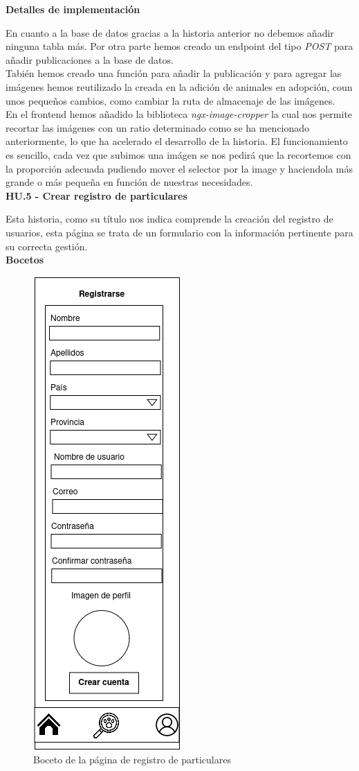\textbf{Detalles de implementación}

En cuanto a la base de datos gracias a la historia anterior no debemos añadir ninguna tabla más. Por otra parte hemos creado un endpoint del tipo \textit{POST} para añadir publicaciones a la base de datos. \\

Tabién hemos creado una función para añadir la publicación y para agregar las imágenes hemos reutilizado la creada en la adición de animales en adopción, coun unos pequeños cambios, como cambiar la ruta de almacenaje de las imágenes. \\ 

En el frontend hemos añadido la biblioteca \textit{ngx-image-cropper} la cual nos permite recortar las imágenes con un ratio determinado como se ha mencionado anteriormente, lo que ha acelerado el desarrollo de la historia. El funcionamiento es sencillo, cada vez que subimos una imágen se nos pedirá que la recortemos con la proporción adecuada pudiendo mover el selector por la image y haciendola más grande o más pequeña en función de nuestras necesidades. \\


\Large{\textbf{HU.5 - Crear registro de particulares}}

Esta historia, como su título nos indica comprende la creación del registro de usuarios, esta página se trata de un formulario con la información pertinente para su correcta gestión.\\

\textbf{Bocetos}
\begin{figure}[H]
	\centering
	\includegraphics[width=0.31\linewidth]{"sprint 2/hu5/registro_particulares"}
	\caption{Boceto de la página de registro de particulares}
	\label{fig:registroparticulares}
\end{figure}

